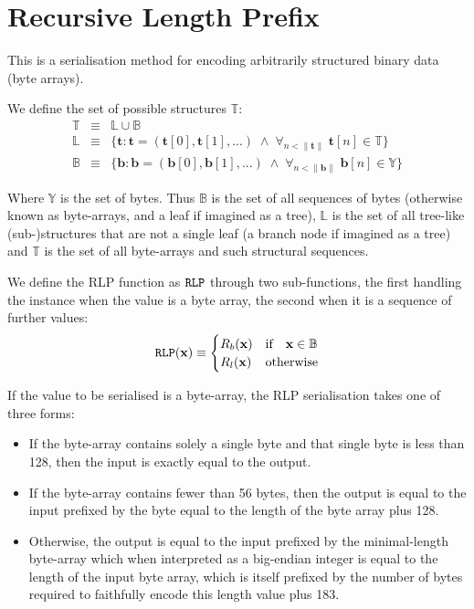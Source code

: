 \documentclass[9pt,oneside]{amsart}
\begin{document}
\section{Recursive Length Prefix}\label{app:rlp}
This is a serialisation method for encoding arbitrarily structured binary data (byte arrays).

We define the set of possible structures $\mathbb{T}$:
\begin{eqnarray}
\mathbb{T} & \equiv & \mathbb{L} \cup \mathbb{B} \\
\mathbb{L} & \equiv & \{ \mathbf{t}: \mathbf{t} = ( \mathbf{t}[0], \mathbf{t}[1], ... ) \; \wedge \; \forall_{n < \lVert \mathbf{t} \rVert} \; \mathbf{t}[n] \in \mathbb{T} \} \\
\mathbb{B} & \equiv & \{ \mathbf{b}: \mathbf{b} = ( \mathbf{b}[0], \mathbf{b}[1], ... ) \; \wedge \; \forall_{n < \lVert \mathbf{b} \rVert} \; \mathbf{b}[n] \in \mathbb{Y} \}
\end{eqnarray}

Where $\mathbb{Y}$ is the set of bytes. Thus $\mathbb{B}$ is the set of all sequences of bytes (otherwise known as byte-arrays, and a leaf if imagined as a tree), $\mathbb{L}$ is the set of all tree-like (sub-)structures that are not a single leaf (a branch node if imagined as a tree) and $\mathbb{T}$ is the set of all byte-arrays and such structural sequences.

We define the RLP function as $\mathtt{\tiny RLP}$ through two sub-functions, the first handling the instance when the value is a byte array, the second when it is a sequence of further values:
\begin{equation}
\mathtt{\tiny RLP}(\mathbf{x}) \equiv \begin{cases} R_b(\mathbf{x}) & \text{if} \quad \mathbf{x} \in \mathbb{B} \\ R_l(\mathbf{x}) & \text{otherwise} \end{cases}
\end{equation}

If the value to be serialised is a byte-array, the RLP serialisation takes one of three forms:

\begin{itemize}
\item If the byte-array contains solely a single byte and that single byte is less than 128, then the input is exactly equal to the output.
\item If the byte-array contains fewer than 56 bytes, then the output is equal to the input prefixed by the byte equal to the length of the byte array plus 128.
\item Otherwise, the output is equal to the input prefixed by the minimal-length byte-array which when interpreted as a big-endian integer is equal to the length of the input byte array, which is itself prefixed by the number of bytes required to faithfully encode this length value plus 183.
\end{itemize}
\end{document}
